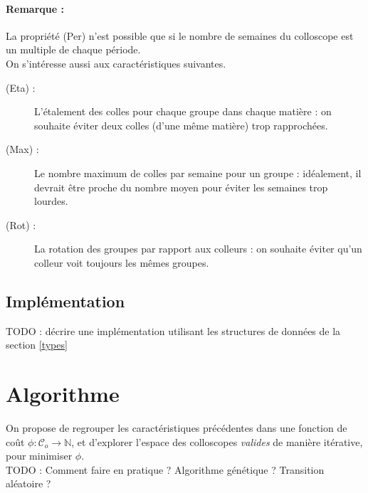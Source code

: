 \documentclass{article}
\begin{document}
\paragraph{Remarque :} La propriété (Per) n'est possible que si le nombre de semaines du colloscope est un
multiple de chaque période. \\


On s'intéresse aussi aux caractéristiques suivantes.
\begin{description}
    \item[(Eta) :] L'étalement des colles pour chaque groupe dans chaque matière : on souhaite éviter deux colles (d'une même matière) trop rapprochées.
    \item[(Max) :] Le nombre maximum de colles par semaine pour un groupe : idéalement, il devrait être proche du nombre moyen pour éviter les semaines trop lourdes.
    \item[(Rot) :] La rotation des groupes par rapport aux colleurs : on souhaite éviter qu'un colleur voit toujours les mêmes groupes.
\end{description}

\subsection{Implémentation}

TODO : décrire une implémentation utilisant les structures de données de la section \ref{types}

\section{Algorithme}

On propose de regrouper les caractéristiques précédentes dans une fonction de coût $ \phi : \mathcal{C}_o \rightarrow \mathbb{N}$,
et d'explorer l'espace des colloscopes \emph{valides} de manière itérative, pour minimiser $\phi$. \\

TODO : Comment faire en pratique ? Algorithme génétique ? Transition aléatoire ?
\end{document}
